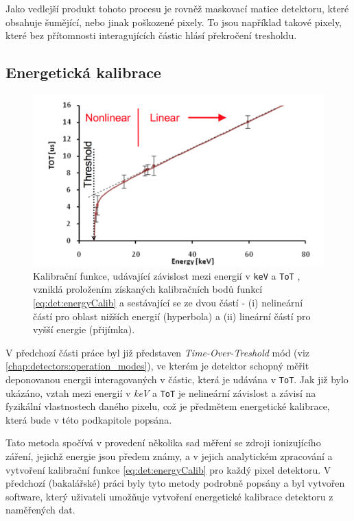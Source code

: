 Jako vedlejší produkt tohoto procesu je rovněž maskovací matice detektoru, které obsahuje šumějící, nebo jinak poškozené pixely. To jsou například takové pixely, které bez přítomnosti interagujících částic hlásí překročení tresholdu.

\subsection{Energetická kalibrace}\label{chap:detectors:calibration:energy}
\begin{figure}[th]
	\begin{center}
		\includegraphics[width=13cm]{figures/calib_function.png}
		\caption{Kalibrační funkce, udávající závislost mezi energií v \texttt{keV} a \texttt{ToT} \cite{Jakubek2011S262}, vzniklá proložením získaných kalibračních bodů funkcí \ref{eq:det:energyCalib} a sestávající se ze dvou částí - (i) nelineární částí pro oblast nižších energií (hyperbola) a (ii) lineární částí pro vyšší energie (přijímka).}
		\label{fig:det:calib:calib_function}
	\end{center}
\end{figure}

V předchozí části práce byl již představen \textit{Time-Over-Treshold} mód (viz \ref{chap:detectors:operation_modes}), ve kterém je detektor schopný měřit deponovanou energii interagovaných v částic, která je udávána v \texttt{ToT}. Jak již bylo ukázáno, vztah mezi energií v \textit{keV} a \texttt{ToT} je nelineární závislost a závisí na fyzikální vlastnostech daného pixelu, což je předmětem energetické kalibrace, která bude v této podkapitole popsána.

Tato metoda \cite{Jakubek2011S262} spočívá v provedení několika sad měření se zdroji ionizujícího záření, jejichž energie jsou předem známy, a v jejich analytickém zpracování a vytvoření kalibrační funkce \ref{eq:det:energyCalib} pro každý pixel detektoru. V předchozí (bakalářské) práci \cite{BegeraBcThesis2016} byly tyto metody podrobně popsány a byl vytvořen software, který uživateli umožňuje vytvoření energetické kalibrace detektoru z naměřených dat.


